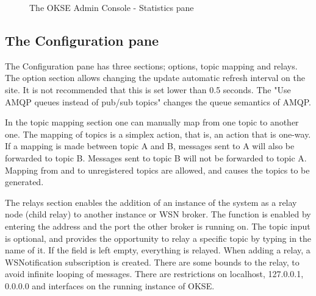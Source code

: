 \begin{center}
  \begin{figure}[ht!]
    \caption{The OKSE Admin Console - Statistics pane} 
    \label{fig:OKSE Admin Console - Statistics pane}
  \end{figure}
\end{center}

\subsection{The Configuration pane}
The Configuration pane has three sections; options, topic mapping and relays. The option section allows changing the update automatic refresh interval on the site. It is not recommended that this is set lower than 0.5 seconds. The "Use AMQP queues instead of pub/sub topics" changes the queue semantics of AMQP.

In the topic mapping section one can manually map from one topic to another one. The mapping of topics is a simplex action, that is, an action that is one-way. If a mapping is made between topic A and B, messages sent to A will also be forwarded to topic B. Messages sent to topic B will not be forwarded to topic A. Mapping from and to unregistered topics are allowed, and causes the topics to be generated.

The relays section enables the addition of an instance of the system as a relay node (child relay) to another instance or WSN broker. The function is enabled by entering the address and the port the other broker is running on. The topic input is optional, and provides the opportunity to relay a specific topic by typing in the name of it. If the field is left empty, everything is relayed. When adding a relay, a WSNotification subscription is created. There are some bounds to the relay, to avoid infinite looping of messages. There are restrictions on localhost, 127.0.0.1, 0.0.0.0 and interfaces on the running instance of OKSE.

